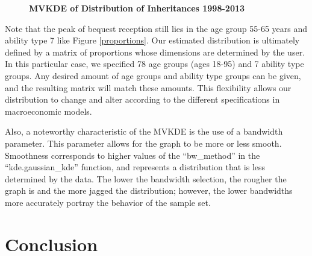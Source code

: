 \documentclass[letterpaper,12pt]{article}
\newcommand{\quotes}[1]{``#1''}
\theoremstyle{definition}
\begin{document}
\begin{spacing}{1.5}
    \begin{figure}[htbp]\centering \captionsetup{width=6.0in}
      \caption{\label{MVKDE}\textbf{MVKDE of Distribution of Inheritances 1998-2013}}
    \end{figure}

    Note that the peak of bequest reception still lies in the age group 55-65 years and ability type 7 like Figure \ref{proportions}. Our estimated distribution is ultimately defined by a matrix of proportions whose dimensions are determined by the user. In this particular case, we specified 78 age groups (ages 18-95) and 7 ability type groups. Any desired amount of age groups and ability type groups can be given, and the resulting matrix will match these amounts. This flexibility allows our distribution to change and alter according to the different specifications in macroeconomic models.

    Also, a noteworthy characteristic of the MVKDE is the use of a bandwidth parameter. This parameter allows for the graph to be more or less smooth. Smoothness corresponds to higher values of the \quotes{bw\_method} in the \quotes{kde.gaussian\_kde} function, and represents a distribution that is less determined by the data. The lower the bandwidth selection, the rougher the graph is and the more jagged the distribution; however, the lower bandwidths more accurately portray the behavior of the sample set.


\section{Conclusion}\label{SecConclusion}


\end{spacing}
\end{document}
